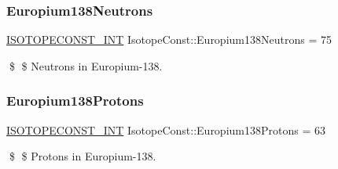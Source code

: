 \subsubsection{\texorpdfstring{Europium138\+Neutrons}{Europium138Neutrons}}
{\footnotesize\ttfamily \mbox{\hyperlink{group___isotope_const-_macros_ga5f18360b3e99483a35c32d789e62621c}{I\+S\+O\+T\+O\+P\+E\+C\+O\+N\+S\+T\+\_\+\+I\+NT}} Isotope\+Const\+::\+Europium138\+Neutrons = 75}

\$ \$ Neutrons in Europium-\/138. \mbox{\label{group___isotope_const-_europium-_eu138_ga8c6fe5e9dc53e72ab096e6acd8fadb21}} 
\subsubsection{\texorpdfstring{Europium138\+Protons}{Europium138Protons}}
{\footnotesize\ttfamily \mbox{\hyperlink{group___isotope_const-_macros_ga5f18360b3e99483a35c32d789e62621c}{I\+S\+O\+T\+O\+P\+E\+C\+O\+N\+S\+T\+\_\+\+I\+NT}} Isotope\+Const\+::\+Europium138\+Protons = 63}

\$ \$ Protons in Europium-\/138. 